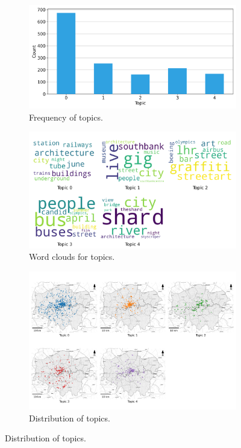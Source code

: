 \documentclass{article}
\theoremstyle{remark}
\begin{document}
\begin{figure}[!h]
    \centering
    \begin{subfigure}{0.45\textwidth}
        \centering
        \includegraphics[width=\linewidth]{figures/places_sense_weekday_locals.png} 
        \caption{Frequency of topics.}
        \label{fig:places_sense_weekday_locals}
    \end{subfigure}
    \hfill
    \begin{subfigure}{0.5\textwidth}
        \centering
        \includegraphics[width=\linewidth]{figures/topics_weekday_locals.png} 
        \caption{Word clouds for topics.}
        \label{fig:topics_weekday_locals}
    \end{subfigure}
    
    \begin{subfigure}{0.9\textwidth}
        \centering
        \includegraphics[width=\linewidth]{figures/topics_distribution_weekday_locals.png} 
        \caption{Distribution of topics.}
        \label{fig:topics_distribution_weekday_locals}
    \end{subfigure}


\end{figure}
\end{document}
